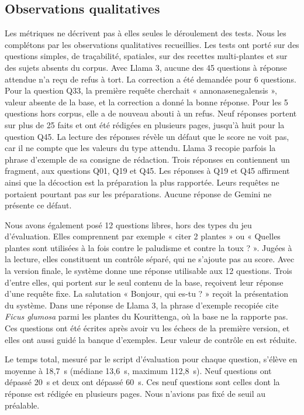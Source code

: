 \subsection{Observations qualitatives}
\label{subsec:res_observations}

Les métriques ne décrivent pas à elles seules le déroulement des tests. Nous les complétons par les observations qualitatives recueillies. Les tests ont porté sur des questions simples, de traçabilité, spatiales, sur des recettes multi-plantes et sur des sujets absents du corpus. Avec Llama 3, aucune des 45 questions à réponse attendue n'a reçu de refus à tort. La correction a été demandée pour 6 questions. Pour la question Q33, la première requête cherchait « annonasenegalensis », valeur absente de la base, et la correction a donné la bonne réponse. Pour les 5 questions hors corpus, elle a de nouveau abouti à un refus. Neuf réponses portent sur plus de 25 faits et ont été rédigées en plusieurs pages, jusqu'à huit pour la question Q45. La lecture des réponses révèle un défaut que le score ne voit pas, car il ne compte que les valeurs du type attendu. Llama 3 recopie parfois la phrase d'exemple de sa consigne de rédaction. Trois réponses en contiennent un fragment, aux questions Q01, Q19 et Q45. Les réponses à Q19 et Q45 affirment ainsi que la décoction est la préparation la plus rapportée. Leurs requêtes ne portaient pourtant pas sur les préparations. Aucune réponse de Gemini ne présente ce défaut.

Nous avons également posé 12 questions libres, hors des types du jeu d'évaluation. Elles comprennent par exemple « citer 2 plantes » ou « Quelles plantes sont utilisées à la fois contre le paludisme et contre la toux ? ». Jugées à la lecture, elles constituent un contrôle séparé, qui ne s'ajoute pas au score. Avec la version finale, le système donne une réponse utilisable aux 12 questions. Trois d'entre elles, qui portent sur le seul contenu de la base, reçoivent leur réponse d'une requête fixe. La salutation « Bonjour, qui es-tu ? » reçoit la présentation du système. Dans une réponse de Llama 3, la phrase d'exemple recopiée cite \textit{Ficus glumosa} parmi les plantes du Kourittenga, où la base ne la rapporte pas. Ces questions ont été écrites après avoir vu les échecs de la première version, et elles ont aussi guidé la banque d'exemples. Leur valeur de contrôle en est réduite.

Le temps total, mesuré par le script d'évaluation pour chaque question, s'élève en moyenne à 18,7~s (médiane 13,6~s, maximum 112,8~s). Neuf questions ont dépassé 20~s et deux ont dépassé 60~s. Ces neuf questions sont celles dont la réponse est rédigée en plusieurs pages. Nous n'avions pas fixé de seuil au préalable.

